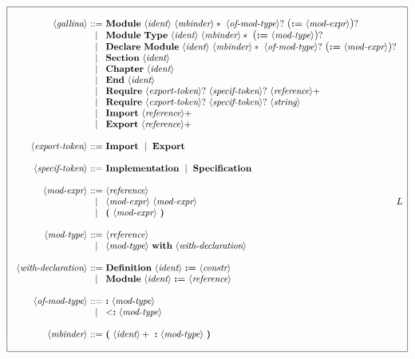 \documentclass{article}
\makeatletter
\def\GR#1{\text{\large(}#1\text{\large)}}
\def\NT#1{\langle\textit{#1}\rangle}
\def\NTL#1#2{\langle\textit{#1}\rangle_{#2}}
\def\TERM#1{{\bf\textrm{\bf #1}}}
\def\KWD#1{\TERM{#1}}
\def\STAR#1{#1*}
\def\PLUS#1{#1+}
\def\OPT#1{#1?}
\def\OPTGR#1{\GR{#1}?}
\newenvironment{cadre}
        {\begin{array}{|c|}\hline\\}
        {\\\\\hline\end{array}}
\newenvironment{rulebox}
        {$$\begin{cadre}\begin{array}{r@{~}c@{~}l@{}l@{}r}}
        {\end{array}\end{cadre}$$}
\def\DEFNT#1{\NT{#1} & ::= &}
\def\SEPDEF{\\\\}
\def\nlsep{\\&|&}
\newenvironment{rules}
        {\begin{center}\begin{rulebox}}
        {\end{rulebox}\end{center}}
\makeatother
\begin{document}
\begin{rules}
\DEFNT{gallina}
       \TERM{Module}~\NT{ident}~\STAR{\NT{mbinder}}~\OPT{\NT{of-mod-type}}
       ~\OPTGR{\KWD{:=}~\NT{mod-expr}}
\nlsep \TERM{Module}~\KWD{Type}~\NT{ident}~\STAR{\NT{mbinder}}
       ~\OPTGR{\KWD{:=}~\NT{mod-type}}
\nlsep \TERM{Declare}~\TERM{Module}~\NT{ident}~\STAR{\NT{mbinder}}
       ~\OPT{\NT{of-mod-type}}
       ~\OPTGR{\KWD{:=}~\NT{mod-expr}}
\nlsep \TERM{Section}~\NT{ident}
\nlsep \TERM{Chapter}~\NT{ident}
\nlsep \TERM{End}~\NT{ident}
\nlsep \TERM{Require}~\OPT{\NT{export-token}}~\OPT{\NT{specif-token}}
       ~\PLUS{\NT{reference}}
\nlsep \TERM{Require}~\OPT{\NT{export-token}}~\OPT{\NT{specif-token}}
       ~\NT{string}
\nlsep \TERM{Import}~\PLUS{\NT{reference}}
\nlsep \TERM{Export}~\PLUS{\NT{reference}}
\SEPDEF
\DEFNT{export-token}
       \TERM{Import} ~\mid~ \TERM{Export}
\SEPDEF
\DEFNT{specif-token}
       \TERM{Implementation} ~\mid~ \TERM{Specification}
\SEPDEF
\DEFNT{mod-expr}
       \NT{reference}
\nlsep \NT{mod-expr}~\NT{mod-expr} & L
\nlsep \KWD{(}~\NT{mod-expr}~\KWD{)}
\SEPDEF
\DEFNT{mod-type}
       \NT{reference}
\nlsep \NT{mod-type}~\KWD{with}~\NT{with-declaration}
\SEPDEF
\DEFNT{with-declaration}
       \TERM{Definition}~\NT{ident}~\KWD{:=}~\NTL{constr}{} %
\nlsep \TERM{Module}~\NT{ident}~\KWD{:=}~\NT{reference}
\SEPDEF
\DEFNT{of-mod-type}
       \KWD{:}~\NT{mod-type}
\nlsep \TERM{$<$:}~\NT{mod-type}
\SEPDEF
\DEFNT{mbinder}
       \KWD{(}~\PLUS{\NT{ident}}~\KWD{:}~\NT{mod-type}~\KWD{)}
\end{rules}
\end{document}
